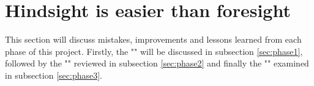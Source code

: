 \section{Hindsight is easier than foresight}
\label{sec:res-discussion}
This section will discuss mistakes, improvements and lessons learned from each phase of this project. %
Firstly,
the "" will be discussed in subsection \ref{sec:phase1}, 
followed by the "" reviewed in subsection \ref{sec:phase2} 
and finally the "" examined in subsection \ref{sec:phase3}.
